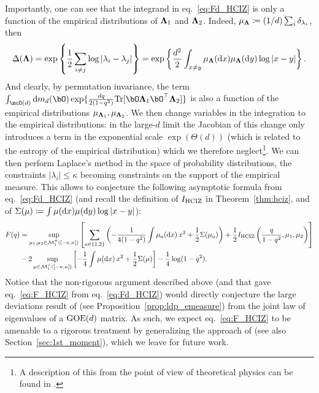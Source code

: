 \myskip
Importantly, one can see that the integrand in eq.~\eqref{eq:Fd_HCIZ} is only a function of the empirical distributions of ${\boldsymbol{\Lambda}}_1$ and ${\boldsymbol{\Lambda}}_2$. 
Indeed, $\mu_{\boldsymbol{\Lambda}} \coloneqq (1/d)\sum_i \delta_{\lambda_i}$, then
\begin{align*}
    \Delta({\boldsymbol{\Lambda}}) = \exp\left\{\frac{1}{2} \sum_{i\neq j} \log |\lambda_i - \lambda_j| \right\} 
    = \exp\left\{\frac{d^2}{2} \int_{x \neq y} \mu_{\boldsymbol{\Lambda}}(\mathrm{d} x) \mu_{\boldsymbol{\Lambda}}(\mathrm{d} y) \log |x - y|\right\}.
\end{align*}
And clearly, by permutation invariance,
the term $\int_{\mcO(d)} \rd m_d (\bO) \exp\{\frac{dq}{2(1-q^2)} \Tr[\bO \bLambda_1 \bO^\T \bLambda_2]\}$ 
is also a function of the empirical distributions $\mu_{{\boldsymbol{\Lambda}}_1}, \mu_{{\boldsymbol{\Lambda}}_2}$.
We then change variables in the integration to the empirical distributions:
in the large-$d$ limit the Jacobian of this change only introduces a term in the exponential scale $\exp(\Theta(d))$
(which is related to the entropy of the empirical distribution) which we therefore neglect\footnote{
A description of this from the point of view of theoretical physics can be found in \cite{vivo2007large}.
}.
We can then perform Laplace's method in the space of probability distributions, the constraints $|\lambda_i| \leq \kappa$ becoming constraints on the support of the empirical measure. 
This allows to conjecture the following asymptotic formula from eq.~\eqref{eq:Fd_HCIZ} (and recall the definition of $I_{\mathrm{HCIZ}}$ in Theorem~\ref{thm:hciz}, and of $\Sigma(\mu) \coloneqq \int \mu(\mathrm{d} x) \mu(\mathrm{d} y) \log |x-y|$):
\begin{align}\label{eq:F_HCIZ}
    F(q) &= \sup_{\mu_1, \mu_2 \in \mathcal{M}_1^+([-\kappa, \kappa])} \left[ \sum_{a \in \{1,2\}} \left(-\frac{1}{4(1-q^2)} \int \mu_a(\mathrm{d} x) \, x^2 + \frac{1}{2} \Sigma(\mu_a)\right)+ \frac{1}{2} I_{\mathrm{HCIZ}}\left(\frac{q}{1-q^2}, \mu_1, \mu_2\right)\right] 
    \nonumber
    \\ &- 2 \sup_{\mu \in \mathcal{M}_1^+([-\kappa, \kappa])} \left[-\frac{1}{4} \int \mu(\mathrm{d} x) \, x^2 + \frac{1}{2} \Sigma(\mu)\right] - \frac{1}{4} \log(1-q^2).
\end{align}
Notice that the non-rigorous argument described above (and that gave eq.~\eqref{eq:F_HCIZ} from eq.~\eqref{eq:Fd_HCIZ}) would directly conjecture the large deviations result of \cite{arous1997large} (see Proposition~\ref{prop:ldp_emeasure}) 
from the joint law of eigenvalues of a $\mathrm{GOE}(d)$ matrix. As such, we expect eq.~\eqref{eq:F_HCIZ} to be amenable to a rigorous treatment by generalizing the approach 
of \cite{arous1997large} (see also Section~\ref{sec:1st_moment}), which we leave for future work.

